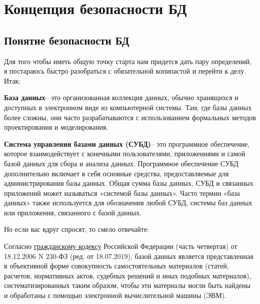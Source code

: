 \section{Концепция безопасности БД}

\subsection{Понятие безопасности БД}
Для того чтобы иметь общую точку старта нам придется дать пару определений, я постараюсь быстро разобраться с обязательной копипастой и перейти к делу. Итак:

\begin{grayquote}
	\textbf{База данных}\footnotemark -- это организованная коллекция данных, обычно хранящихся и доступных в электронном виде из компьютерной системы. Там, где базы данных более сложны, они часто разрабатываются с использованием формальных методов проектирования и моделирования.
\end{grayquote}

\begin{grayquote}
	\textbf{Система управления базами данных (СУБД)}\footnotemark[\value{footnote}] -- это программное обеспечение, которое взаимодействует с конечными пользователями, приложениями и самой базой данных для сбора и анализа данных. Программное обеспечение СУБД дополнительно включает в себя основные средства, предоставляемые для администрирования базы данных. Общая сумма базы данных, СУБД и связанных приложений может называться «системой базы данных». Часто термин «база данных» также используется для обозначения любой СУБД, системы баз данных или приложения, связанного с базой данных.
\end{grayquote}

Но если вас вдруг спросят, то смело отвечайте:
\begin{grayquote}
	Согласно \href{http://www.consultant.ru/cons/cgi/online.cgi?rnd=77B9A55845722924B47D00E78BFA3E50\&req=doc\&base=LAW\&n=329334\&dst=100282\&fld=134#2e1eph4wwt8}{гражданскому кодексу} Российской Федерации (часть четвертая) от 18.12.2006 N 230-ФЗ (ред. от 18.07.2019), базой данных является представленная в объективной форме совокупность самостоятельных материалов (статей, расчетов, нормативных актов, судебных решений и иных подобных материалов), систематизированных таким образом, чтобы эти материалы могли быть найдены и обработаны с помощью электронной вычислительной машины (ЭВМ).
\end{grayquote}


